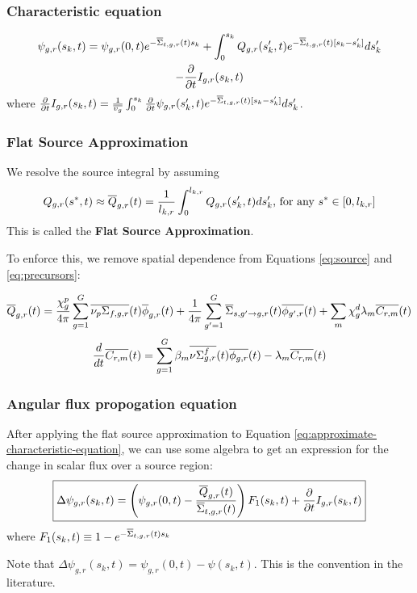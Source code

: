\begin{frame}
  \frametitle{Characteristic equation}
    \begin{multline}
        \label{eq:approximate-characteristic-equation}
        \psi_{g,r}(s_k, t) = \psi_{g,r}(0, t) e^{-\overline{\Sigma}_{t,g,r}(t)s_k}  + \int_0^{s_k}
        Q_{g,r}(s_k', t) e^{-\overline{\Sigma}_{t,g,r}(t)[s_k - s_k']} ds_k'\\
        - \frac{\partial}{\partial t} I_{g,r}(s_{k},t)
    \end{multline}
    where $\frac{\partial}{\partial t} I_{g,r}(s_{k},t) = \frac{1}{\overline{v_g}} \int_0^{s_k} \frac{\partial}{\partial t} \psi_{g,r}(s_k', t)
        e^{-\overline{\Sigma}_{t,g,r}(t)[s_k-s_k']} ds_k'$.
\end{frame}

\begin{frame}
  \frametitle{Flat Source Approximation}
    We resolve the source integral by assuming
    \begin{equation}
        Q_{g,r}(s^*,t) \approx \overline{Q}_{g,r}(t) = \frac{1}{l_{k,r}}\int_0^{l_{k,r}}
        Q_{g,r}(s_k', t) d s_k' \text{, for any } s^* \in [0, l_{k,r}]
    \end{equation} 
    This is called the {\bf Flat Source Approximation}.

    To enforce this, we remove spatial dependence from Equations \ref{eq:source} 
    and \ref{eq:precursors}:

    \begin{equation}
        \label{eq:flat-source}
        \overline{Q}_{g,r}(t) = \frac{\chi_{g}^p}{4\pi} \sum_{g=1}^G
        \overline{\nu_{p}\Sigma_{f,g,r}}(t)\overline{\phi}_{g,r}(t) +
        \frac{1}{4\pi}\sum_{g'=1}^G
    \overline{\Sigma}_{s,g'\rightarrow g, r}(t) \overline{\phi_{g',r}}(t) +
        \sum_m \chi^d_{g} \lambda_m \overline{C_{r,m}}(t)
    \end{equation}
    \begin{equation}
        \label{eq:dnp-eq-flat}
        \frac{d}{d t} \overline{C_{r,m}}(t) = \sum_{g=1}^G\beta_m
        \overline{\nu\Sigma_{g,r}^f}(t)\overline{\phi_{g,r}}(t) - \lambda_m
        \overline{C_{r,m}}(t)
    \end{equation}
\end{frame}

\begin{frame}
  \frametitle{Angular flux propogation equation}
  After applying the flat source approximation to Equation
  \ref{eq:approximate-characteristic-equation}, we can use some algebra to get
  an expression for the change in scalar flux over a source region:
  \begin{equation}
        \label{eq:flat-characteristic-equation-delta}
        \boxed{
        \Delta \psi_{g,r}(s_k,t) = \left(
        \psi_{g,r}(0, t) - \frac{\overline{Q}_{g,r}(t)}{\overline{\Sigma}_{t,g,r}(t)}\right)F_1(s_k,t) + \frac{\partial}{\partial t} I_{g,r}(s_k, t)
        }
  \end{equation}
  where $F_1(s_{k},t) \equiv 1 - e^{-\overline{\Sigma}_{t,g,r}(t) s_{k}}$

  Note that $\Delta \psi_{g,r}(s_{k},t) = \psi_{g,r}(0,t) - \psi(s_{k},t)$. This
  is the convention in the literature.
\end{frame}




